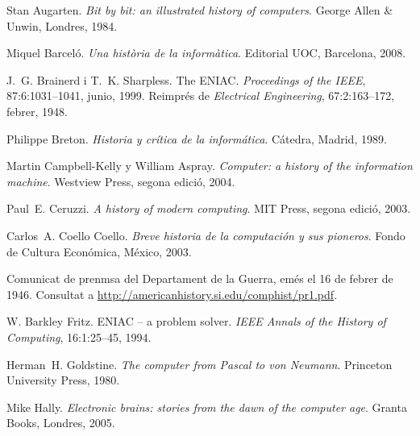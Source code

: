 \documentclass[11pt,catalan,
               listoftables,listoffigures,listofalgorithms,listofquadres]
               {tfgetsinf}
\begin{document}
\lipsum[22]
\lipsum[23]
\lipsum[24]


\begin{thebibliography}{10}

Stan Augarten.
\newblock \textit{Bit by bit: an illustrated history of computers}.
\newblock George Allen \& Unwin, Londres, 1984.

Miquel Barceló.
\newblock \textit{Una història de la informàtica}.
\newblock Editorial UOC, Barcelona, 2008.

J.~G. Brainerd i T.~K. Sharpless.
\newblock The ENIAC.
\newblock \textit{Proceedings of the IEEE}, 87:6:1031--1041, junio, 1999. 
\newblock Reimprés de \textit{Electrical Engineering}, 67:2:163--172, febrer, 1948. 

Philippe Breton.
\newblock \textit{Historia y crítica de la informática}.
\newblock Cátedra, Madrid, 1989.

Martin Campbell-Kelly y William Aspray.
\newblock \textit{Computer: a history of the information machine}.
\newblock Westview Press, segona edició, 2004.

Paul~E. Ceruzzi.
\newblock \textit{A history of modern computing}.
\newblock MIT Press, segona edició, 2003.

Carlos~A. Coello Coello.
\newblock \textit{Breve historia de la computación y sus pioneros}.
\newblock Fondo de Cultura Económica, México, 2003.

Comunicat de prenmsa del Departament de la Guerra, emés el 16 de febrer de 1946. 
\newblock Consultat a \url{http://americanhistory.si.edu/comphist/pr1.pdf}.

W. Barkley Fritz.
\newblock ENIAC -- a problem solver.
\newblock \textit{IEEE Annals of the History of Computing}, 16:1:25--45, 1994.

Herman~H. Goldstine.
\newblock \textit{The computer from Pascal to von Neumann}.
\newblock Princeton University Press, 1980.

Mike Hally.
\newblock \textit{Electronic brains: stories from the dawn of the computer age}.
\newblock Granta Books, Londres, 2005.


\end{thebibliography}
\end{document}
